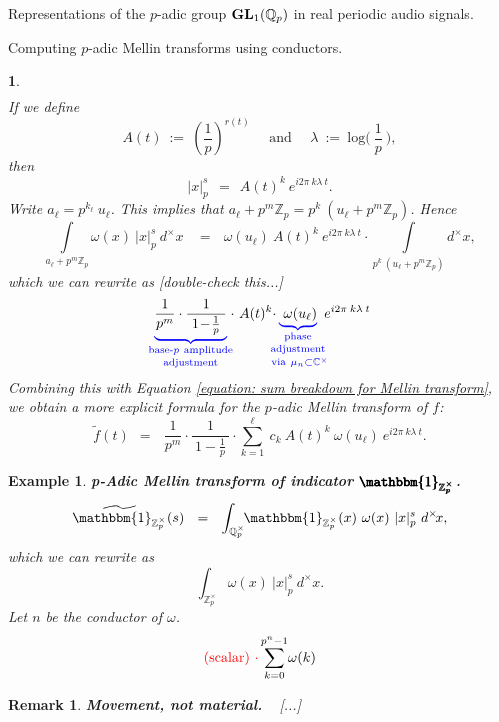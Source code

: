 \documentclass[letterpaper,11pt, reqno]{amsart}
\newtheorem{monodromy theorem}{Monodromy Theorem}[subsection]
\newtheorem{wild conjecture}[theorem]{Wild Conjecture}
\newtheorem{research objectives}{Research objectives}[subsection]
\newtheorem{research question}[theorem]{Research questions}
\newtheorem{aside question}[theorem]{Aside question}
\newtheorem{example}[theorem]{Example}
\newtheorem{audio example}[theorem]{\loudspeaker[3] Example}
\newtheorem{blank remark}[theorem]{}
\newtheorem{ssubsection}[theorem]{}
\newtheorem{terminology and comment}[theorem]{Terminology and comment}
\newtheorem{purity hypothesis}[theorem]{Purity hypothesis}
\newtheorem{corollary of the purity hypothesis}[theorem]{Corollary of the purity hypothesis}
\newtheorem{rem1}[theorem]{Remark}
\newenvironment{remark}{\begin{rem1}\em}{\end{rem1}}
\newcommand{\CC} {{\mathbb C}}
\newcommand{\QQ} {{\mathbb Q}}
\newcommand{\ZZ} {{\mathbb Z}}
\numberwithin{equation}{theorem}
\begin{document}
\begin{section}{Representations of the $p$-adic group $\bold{GL}_{1}(\mathbb{Q}_{p})$
in real periodic audio signals.}
\begin{subsection}{Computing $p$-adic Mellin transforms using conductors.}
\begin{ssubsection}
$$\begin{array}{rcl}
	\end{array}
	$$
If we define
	$$
	A(t)
	\ :=\ 
	\left(\frac{1}{p}\right)^{\!\!r(t)}
	\ \ \ \ \ \ \text{and}\ \ \ \ \ \ 
	\lambda
	\ :=\ 
	\text{log}\Big(\ \!\frac{1}{p}\ \!\Big),
	$$
then
	$$
	|x|^{s}_p
	\ \ =\ \ 
	A(t)^k\ e^{i2\pi\ \!k\lambda\ \!t}.
	$$
Write $a_\ell=p^{k_\ell}\ \!u_\ell$. This implies that $a_\ell+p^m\ZZ_p=p^k\ \!(u_\ell+p^m\ZZ_p)$. Hence
	$$
	\underset{{a_\ell+p^m\ZZ_p}}{\int}
	\!\!\!\!\!\omega(x)\ |x|^{s}_{p}\ d^\times\!x
	\ \ \ \ =\ \ \ 
	\omega(u_\ell)\ A(t)^k\ e^{i2\pi\ \!k\lambda\ \!t}\cdot
	\!\!\!\!\!\!\!
	\underset{p^k\ \!(u_\ell+p^m\ZZ_p)}{\int}
	\!\!\!\!\!\!d^\times\!x,
	$$
which we can rewrite as {\color{red} [double-check this...]}
	$$
	{\color{blue}
	\underset{\text{adjustment}}{
	\underset{\text{base-}p\ \text{amplitude}}{
	\underbrace{
	{\color{black}
	\frac{1}{p^m}\cdot\frac{1}{\ 1\!-\!\tfrac{1}{p}\ }
	}}}}\!
	{\color{black} \cdot\ A(t)^k\cdot}
	\underset{\!\!\!\text{via}\ \mu_n\subset\CC^\times\!\!\!\!\!}{
	\underset{\!\!\!\text{adjustment}\!\!\!}{
	\underset{\text{phase}}{
	\underbrace{
	{\color{black}
	\ \omega(u_\ell)}
	}}}}}
	{\color{black} \ e^{i2\pi\ \!k\lambda\ \!t}
	}
	$$
Combining this with Equation \eqref{equation: sum breakdown for Mellin transform}, we obtain a more explicit formula for the $p$-adic Mellin transform of $f$:
	\begin{equation}\label{equation: an explicit formula for Mellin transform}
	\widetilde{f}(t)
	\ \ =\ \ \ 
	\frac{1}{p^m}\cdot\frac{1}{\ 1\!-\!\tfrac{1}{p}\ }\cdot
	\sum^{\ell}_{k=1}\ c_{k}
	\ A(t)^k\ \omega(u_\ell)\ e^{i2\pi\ \!k\lambda\ \!t}.
	\end{equation}
\end{ssubsection}

\begin{example}
{\bf {\em p}-Adic Mellin transform of indicator $\pmb{\mathbbm{1}_{\ZZ^\times_p}}$.}
\normalfont
	$$
	\widetilde{{\mathbbm{1}_{\ZZ^\times_p}}}(s)
	\ \ =\ \ 
	\int_{\QQ^\times_{p}}
	\!\!\mathbbm{1}_{\ZZ^\times_p}(x)\ \omega(x)\ |x|^{s}_{p}\ d^\times\!x,
	$$
which we can rewrite as
	$$
	\int_{\ZZ^\times_p}\!\!\omega(x)\ |x|^{s}_{p}\ d^\times\!x.
	$$
Let $n$ be the conductor of $\omega$.
	$$
	{\color{red} (\text{scalar})\ \cdot}
	\sum_{k=0}^{p^{n}-1}\!\omega(k)
	$$
\end{example}

\begin{remark}
{\bf Movement, not material.}
\ {\color{red} [...]}
\end{remark}


\end{subsection}
\end{section}
\end{document}
